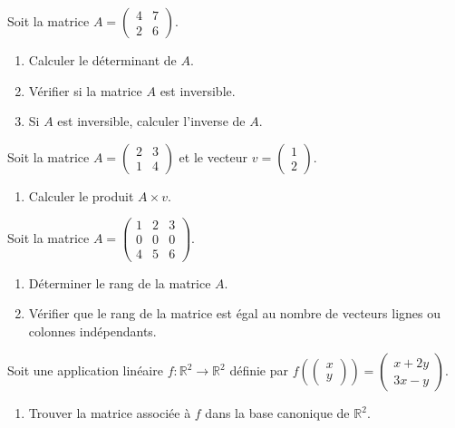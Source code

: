 \begin{exercice}
Soit la matrice \( A = \begin{pmatrix} 4 & 7 \\ 2 & 6 \end{pmatrix} \).
\begin{enumerate}
    \item Calculer le déterminant de \( A \).
    \item Vérifier si la matrice \( A \) est inversible.
    \item Si \( A \) est inversible, calculer l'inverse de \( A \).
\end{enumerate}
\end{exercice}

\begin{exercice}
Soit la matrice \( A = \begin{pmatrix} 2 & 3 \\ 1 & 4 \end{pmatrix} \) et le vecteur \( v = \begin{pmatrix} 1 \\ 2 \end{pmatrix} \).
\begin{enumerate}
    \item Calculer le produit \( A \times v \).
\end{enumerate}
\end{exercice}

\begin{exercice}
Soit la matrice \( A = \begin{pmatrix} 1 & 2 & 3 \\ 0 & 0 & 0 \\ 4 & 5 & 6 \end{pmatrix} \).
\begin{enumerate}
    \item Déterminer le rang de la matrice \( A \).
    \item Vérifier que le rang de la matrice est égal au nombre de vecteurs lignes ou colonnes indépendants.
\end{enumerate}
\end{exercice}

\begin{exercice}
Soit une application linéaire \( f : \mathbb{R}^2 \to \mathbb{R}^2 \) définie par \( f\left( \begin{pmatrix} x \\ y \end{pmatrix} \right) = \begin{pmatrix} x + 2y \\ 3x - y \end{pmatrix} \).
\begin{enumerate}
    \item Trouver la matrice associée à \( f \) dans la base canonique de \( \mathbb{R}^2 \).
\end{enumerate}
\end{exercice}

